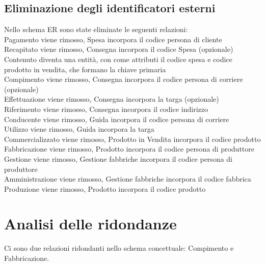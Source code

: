 \documentclass[a4paper,12pt]{report}
\begin{document}
\subsection{Eliminazione degli identificatori esterni}
Nello schema ER sono state eliminate le seguenti relazioni:\\
Pagamento viene rimosso, Spesa incorpora il codice persona di cliente\\
Recapitato viene rimosso, Consegna incorpora il codice Spesa (opzionale)\\
Contenuto diventa una entità, con come attributi il codice spesa e codice prodotto in vendita, che formano la chiave primaria \\
Compimento viene rimosso, Consegna incorpora il codice persona di corriere (opzionale)\\
Effettuazione viene rimosso, Consegna incorpora la targa (opzionale)\\
Riferimento viene rimosso, Consegna incorpora il codice indirizzo\\
Conducente viene rimosso, Guida incorpora il codice persona di corriere\\
Utilizzo viene rimosso, Guida incorpora la targa\\
Commercializzato viene rimosso, Prodotto in Vendita incorpora il codice prodotto\\
Fabbricazione viene rimosso, Prodotto incorpora il codice persona di produttore\\
Gestione viene rimosso, Gestione fabbriche incorpora il codice persona di produttore\\
Amministrazione viene rimosso, Gestione fabbriche incorpora il codice fabbrica\\
Produzione viene rimosso, Prodotto incorpora il codice prodotto\\
\section{Analisi delle ridondanze}
Ci sono due relazioni ridondanti nello schema concettuale: Compimento e Fabbricazione.
\end{document}
